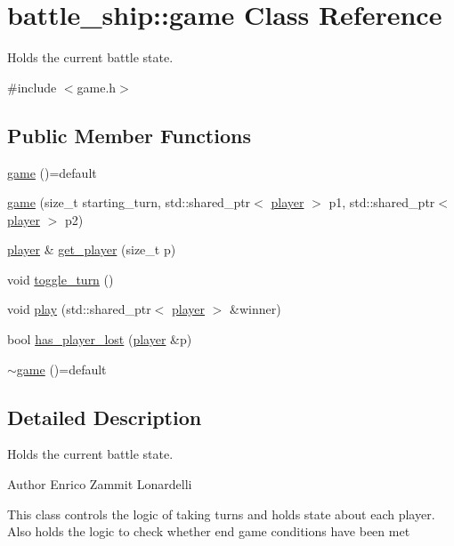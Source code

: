 \hypertarget{classbattle__ship_1_1game}{}\section{battle\+\_\+ship\+:\+:game Class Reference}
\label{classbattle__ship_1_1game}


Holds the current battle state.  




{\ttfamily \#include $<$game.\+h$>$}

\subsection*{Public Member Functions}
\begin{DoxyCompactItemize}
\item 
\hyperlink{classbattle__ship_1_1game_a3a98cd01dec3c29d91d057049c421c89}{game} ()=default
\item 
\hyperlink{classbattle__ship_1_1game_a932962ce40fffb1c8008a353971afa4c}{game} (size\+\_\+t starting\+\_\+turn, std\+::shared\+\_\+ptr$<$ \hyperlink{classbattle__ship_1_1player}{player} $>$ p1, std\+::shared\+\_\+ptr$<$ \hyperlink{classbattle__ship_1_1player}{player} $>$ p2)
\item 
\hyperlink{classbattle__ship_1_1player}{player} \& \hyperlink{classbattle__ship_1_1game_a6a93475d1fae5c83ae58182376f1292c}{get\+\_\+player} (size\+\_\+t p)
\item 
void \hyperlink{classbattle__ship_1_1game_a0e5a85f6c1f0cff5e1104545b5222026}{toggle\+\_\+turn} ()
\item 
void \hyperlink{classbattle__ship_1_1game_a8bd311ac1aaab0a16c06b4f1b9664af4}{play} (std\+::shared\+\_\+ptr$<$ \hyperlink{classbattle__ship_1_1player}{player} $>$ \&winner)
\item 
bool \hyperlink{classbattle__ship_1_1game_a2f6eceb02db97507f52e08c1dafcf5e4}{has\+\_\+player\+\_\+lost} (\hyperlink{classbattle__ship_1_1player}{player} \&p)
\item 
\hyperlink{classbattle__ship_1_1game_aa95dac5c30c567ae407a3b67ceae324d}{$\sim$game} ()=default
\end{DoxyCompactItemize}


\subsection{Detailed Description}
Holds the current battle state. 

\begin{DoxyAuthor}{Author}
Enrico Zammit Lonardelli
\end{DoxyAuthor}
This class controls the logic of taking turns and holds state about each player. Also holds the logic to check whether end game conditions have been met

